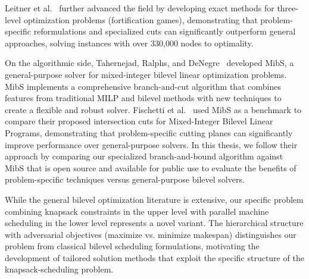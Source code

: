 Leitner et al.~\cite{leitner2023exact} further advanced the field by developing exact methods for three-level optimization problems (fortification games), demonstrating that problem-specific reformulations and specialized cuts can significantly outperform general approaches, solving instances with over 330,000 nodes to optimality.

On the algorithmic side, Tahernejad, Ralphs, and DeNegre~\cite{Tahernejad2020} developed MibS, 
a general-purpose solver for mixed-integer bilevel linear optimization problems. 
MibS implements a comprehensive branch-and-cut algorithm that combines features from traditional MILP and bilevel methods with new techniques to create a flexible and robust solver.
Fischetti et al.~\cite{fischetti2016intersection} used MibS as a benchmark to compare their proposed intersection cuts for Mixed-Integer Bilevel Linear Programs, 
demonstrating that problem-specific cutting planes can significantly improve performance over general-purpose solvers. 
In this thesis, we follow their approach by comparing our specialized branch-and-bound algorithm against MibS that is open source and available for public use to evaluate the benefits of problem-specific techniques versus general-purpose bilevel solvers.

While the general bilevel optimization literature is extensive, our specific problem combining knapsack constraints in the upper level with parallel machine scheduling in the lower level represents a novel variant. The hierarchical structure with adversarial objectives (maximize vs. minimize makespan) distinguishes our problem from classical bilevel scheduling formulations, motivating the development of tailored solution methods that exploit the specific structure of the knapsack-scheduling problem.
